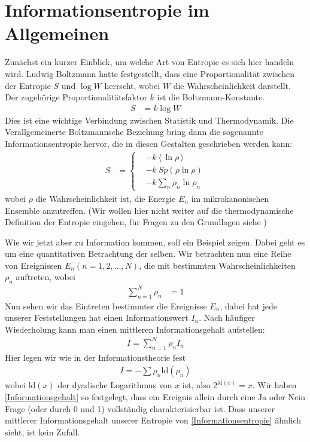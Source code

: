\documentclass[ngerman]{scrartcl}
\newcommand{\erw}[1]{\langle {#1} \rangle}
\begin{document}
\section{Informationsentropie im Allgemeinen} \label{InfoentropieAllg}
Zunächst ein kurzer Einblick, um welche Art von Entropie es sich hier handeln wird. Ludwig Boltzmann hatte festgestellt, dass eine Proportionalität zwischen der Entropie $S$ und $\log W$ herrscht, wobei $W$ die Wahrscheinlichkeit darstellt. Der zugehörige Proportionalitätsfaktor $k$ ist die Boltzmann-Konstante.
	\begin{align}
		S &= k \log W
	\end{align}
Dies ist eine wichtige Verbindung zwischen Statistik und Thermodynamik. 
Die Verallgemeinerte Boltzmannsche Beziehung bring dann die sogenannte Informationsentropie hervor, die in diesen Gestalten geschrieben werden kann:	
	\begin{align} \label{Informationsentropie}
		S &=
		\left\{
		\begin{aligned}
		&- k ~\erw{\,\ln \rho\,} \\
		&-k~ Sp(\rho \ln \rho) \\
		&-k \sum_n \rho_n \ln \rho_n
		\end{aligned}
		\right.
	\end{align}
wobei $\rho$ die Wahrscheinlichkeit ist, die Energie $E_n$ im mikrokanonischen Ensemble anzutreffen. 
(Wir wollen hier nicht weiter auf die thermodynamische Definition der Entropie eingehen, für Fragen zu den Grundlagen siehe \cite{Brenig})

Wie wir jetzt aber zu Information kommen, soll ein Beispiel zeigen. Dabei geht es um eine quantitativen Betrachtung der selben.
Wir betrachten nun eine Reihe von Ereignissen $E_n (n = 1, 2, \ldots, N)$, die mit bestimmten Wahrscheinlichkeiten $\rho_n$ auftreten, wobei
	\begin{align*}
		\sum_{n=1}^N \rho_n &= 1
	\end{align*}
Nun sehen wir das Eintreten bestimmter die Ereignisse $E_n$, dabei hat jede unserer Feststellungen hat einen Informationswert $I_n$. Nach häufiger Wiederholung kann man einen mittleren Informationsgehalt aufstellen:
	\begin{align*}
		I = \sum_{n=1}^N \rho_n I_n
	\end{align*}
Hier legen wir wie in der Informationstheorie fest
	\begin{align*} \label{Informationsgehalt}
		I = - \sum \rho_n \mathrm{ld}(\rho_n)
	\end{align*}
wobei $\mathrm{ld}(x)$ der dyadische Logarithmus von $x$ ist, also $2^{\mathrm{ld}(x)} = x$. 
Wir haben \eqref{Informationsgehalt} so festgelegt, dass ein Ereignis allein durch eine Ja oder Nein Frage (oder durch 0 und 1) vollständig charakterisierbar ist. 
Dass unserer mittlerer Informationsgehalt unserer Entropie von \eqref{Informationsentropie} ähnlich sieht, ist kein Zufall.
\end{document}
